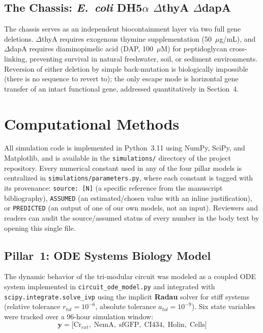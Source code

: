 \documentclass[10pt,twocolumn,letterpaper,
              colorlinks=true,
              linkcolor=blue!70!black,
              citecolor=blue!70!black,
              urlcolor=blue!70!black,
              pdfborder={0 0 0}]{article}
\begin{document}
\subsection{The Chassis: \textit{E.~coli} DH5$\alpha$
            $\Delta$thyA $\Delta$dapA}

The chassis serves as an independent biocontainment layer via two full
gene deletions. $\Delta$thyA requires exogenous thymine supplementation
(50~$\mu$g/mL), and $\Delta$dapA requires diaminopimelic acid (DAP,
100~$\mu$M) for peptidoglycan cross-linking, preventing survival in
natural freshwater, soil, or sediment environments. Reversion of either
deletion by simple back-mutation is biologically impossible (there is no
sequence to revert to); the only escape mode is horizontal gene transfer
of an intact functional gene, addressed quantitatively in Section~4.

\section{Computational Methods}

All simulation code is implemented in Python~3.11 using NumPy, SciPy,
and Matplotlib, and is available in the \texttt{simulations/} directory
of the project repository. Every numerical constant used in any of the
four pillar models is centralized in \texttt{simulations/parameters.py},
where each constant is tagged with its provenance: \texttt{source:~[N]}
(a specific reference from the manuscript bibliography),
\texttt{ASSUMED} (an estimated/chosen value with an inline
justification), or \texttt{PREDICTED} (an output of one of our own
models, not an input). Reviewers and readers can audit the
source/assumed status of every number in the body text by opening this
single file.

\subsection{Pillar~1: ODE Systems Biology Model}

The dynamic behavior of the tri-modular circuit was modeled as a coupled
ODE system implemented in \texttt{circuit\_ode\_model.py} and integrated
with \texttt{scipy.integrate.solve\_ivp} using the implicit \textbf{Radau}
solver for stiff systems (relative tolerance $r_{tol} = 10^{-6}$,
absolute tolerance $a_{tol} = 10^{-9}$). Six state variables were
tracked over a 96-hour simulation window:
\begin{equation}
  \mathbf{y} = \bigl[\text{Cr}_{ext},\;
                     \text{NemA},\;
                     \text{sfGFP},\;
                     \text{CI434},\;
                     \text{Holin},\;
                     \text{Cells}\bigr]
\end{equation}
\end{document}
